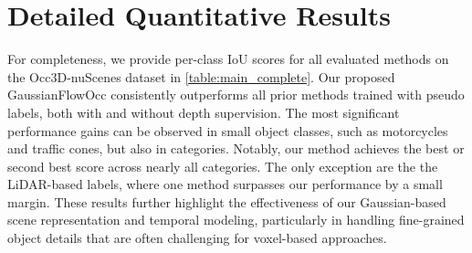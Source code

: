 \clearpage
\setcounter{page}{1}
\maketitlesupplementary
\appendix
\renewcommand\thefigure{\thesection.\arabic{figure}}
\setcounter{figure}{0}

\renewcommand\thetable{\thesection.\arabic{table}}
\setcounter{table}{0}

\section{Detailed Quantitative Results}
For completeness, we provide per-class IoU scores for all evaluated methods on the Occ3D-nuScenes dataset in \cref{table:main_complete}.
Our proposed GaussianFlowOcc consistently outperforms all prior methods trained with pseudo labels, both with and without depth supervision.
The most significant performance gains can be observed in small object classes, such as motorcycles and traffic cones, but also in categories.
Notably, our method achieves the best or second best score across nearly all categories. 
The only exception are the the LiDAR-based labels, where one method surpasses our performance by a small margin.
These results further highlight the effectiveness of our Gaussian-based scene representation and temporal modeling, particularly in handling fine-grained object details that are often challenging for voxel-based approaches.

